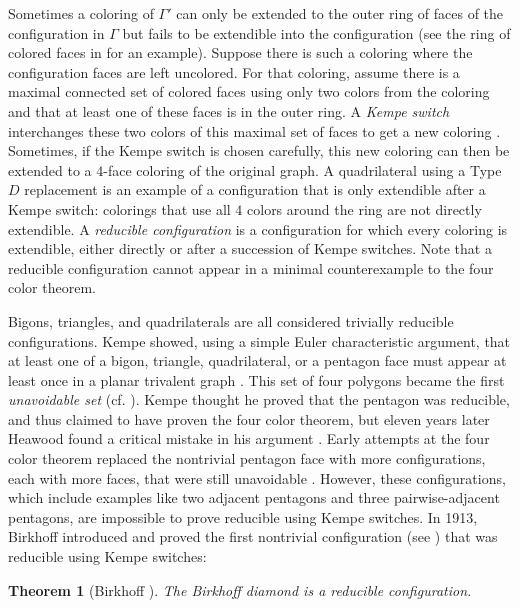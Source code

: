\documentclass[12pt]{amsart}
\newtheorem{theorem}{Theorem}[section]
\theoremstyle{definition}
\theoremstyle{remark}
\numberwithin{equation}{section}
\begin{document}
Sometimes a coloring of $\Gamma'$ can only be extended to the outer ring of faces of the configuration in $\Gamma$ but fails to be extendible into the configuration (see the ring of colored faces in  for an example).  Suppose there is such a coloring where the configuration faces are left uncolored. For that coloring, assume there is a maximal connected set of  colored faces using only two colors from the coloring and that at least one of these faces is in the outer ring. A {\em Kempe switch} interchanges these two colors of this maximal set of faces to get a new coloring  \cite{MT}. Sometimes, if the Kempe switch is chosen carefully, this new coloring can then be extended to a $4$-face coloring of the original graph. A quadrilateral using a Type $D$ replacement is an example of a configuration that is only extendible after a Kempe switch: colorings that use all $4$ colors around the ring are not directly extendible. A {\em reducible configuration} is a configuration for which every coloring is extendible, either directly or after a succession of Kempe switches.  Note that a reducible configuration cannot appear in a minimal counterexample to the four color theorem. 

Bigons, triangles, and quadrilaterals are all considered trivially reducible configurations.  Kempe showed, using a simple Euler characteristic argument, that at least one of a bigon, triangle, quadrilateral, or a pentagon face must appear at least once in a planar trivalent graph \cite{Kempe}.  This set of four polygons became the first {\em unavoidable set} (cf. \cite{Wilson}).  Kempe thought he proved that the pentagon was reducible, and thus claimed to have proven the four color theorem, but eleven years later Heawood found a critical mistake in his argument \cite{Heawood}. Early attempts at the four color theorem replaced the nontrivial pentagon face with more configurations, each with more faces, that were still unavoidable \cite{Wernicke, Franklin}.  However, these configurations, which include examples like two adjacent pentagons and three pairwise-adjacent pentagons, are impossible to prove reducible using Kempe switches.  In 1913, Birkhoff introduced and proved the first nontrivial configuration (see ) that was reducible using Kempe switches:

\begin{theorem}[Birkhoff \cite{Birkhoff}] The Birkhoff diamond is a reducible configuration.
\end{theorem}
\end{document}
